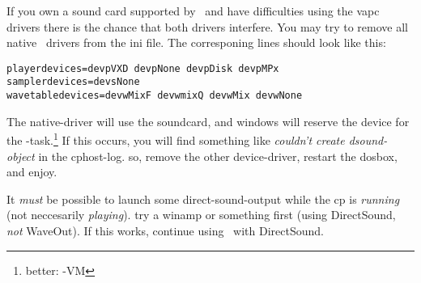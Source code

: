 If you own a sound card supported by \cp\ and have difficulties using
the vapc drivers there is the chance that both drivers interfere. You
may try to remove all native \cp\ drivers from the ini file. The
corresponing lines should look like this:

\begin{verbatim}
playerdevices=devpVXD devpNone devpDisk devpMPx
samplerdevices=devsNone
wavetabledevices=devwMixF devwmixQ devwMix devwNone
\end{verbatim}

\small{
   The native-driver will use the soundcard, and windows will reserve
   the device for the \cp-task.\footnote{better: \cp-VM} If this
   occurs, you will find something like \emph{couldn't create
   dsound-object} in the cphost-log. so, remove the other
   device-driver, restart the dosbox, and enjoy.

   It \emph{must} be possible to launch some direct-sound-output while
   the cp is \emph{running} (not neccesarily \emph{playing}). try a
   winamp or something first (using DirectSound, \emph{not}
   WaveOut). If this works, continue using \cp\ with DirectSound.
}
